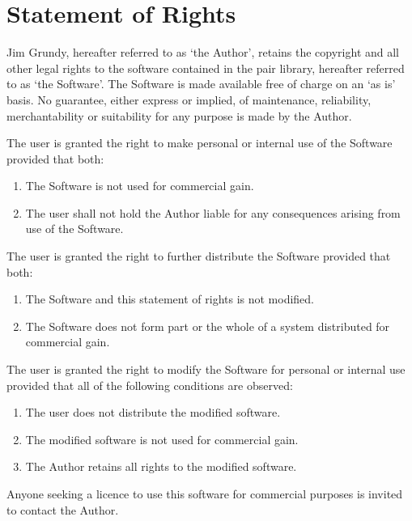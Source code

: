 \chapter{Statement of Rights}

Jim Grundy, hereafter referred to as `the Author', retains the        
copyright and all other legal rights to the software contained in     
the pair library, hereafter referred to as `the Software'.                   
The Software is made available free of charge on an `as is' basis.
No guarantee, either express or implied, of maintenance, reliability,
merchantability or suitability for any purpose is made by the Author.

The user is granted the right to make personal or internal use        
of the Software provided that both:                                   
\begin{enumerate}
	\item	The Software is not used for commercial gain.                      
	\item	The user shall not hold the Author liable for any consequences     
			arising from use of the Software.                                  
\end{enumerate}
The user is granted the right to further distribute the Software      
provided that both:                                                   
\begin{enumerate}
	\item	The Software and this statement of rights is not modified.         
	\item	The Software does not form part or the whole of a system           
			distributed for commercial gain.                                   
\end{enumerate}
The user is granted the right to modify the Software for personal or  
internal use provided that all of the following conditions are        
observed:                                                             
\begin{enumerate}
	\item	The user does not distribute the modified software.                
	\item	The modified software is not used for commercial gain.             
	\item	The Author retains all rights to the modified software.            
\end{enumerate}
                                                                      
Anyone seeking a licence to use this software for commercial purposes 
is invited to contact the Author.                                     

